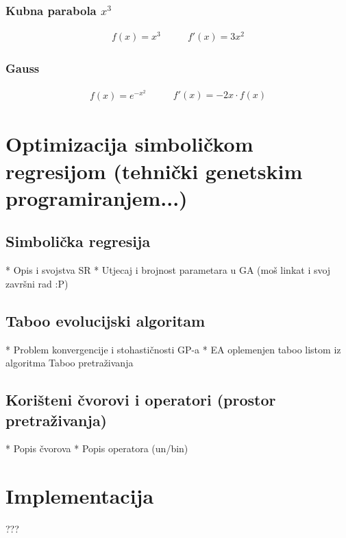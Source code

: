 \documentclass[times, utf8, diplomski]{fer}
\begin{document}
\subsection*{Kubna parabola $x^3$}
\begin{equation}
\begin{split}
f(x) = x^3
\end{split}
\qquad
\begin{split}
f'(x) = 3x^2
\end{split}
\end{equation}

\subsection*{Gauss}
\begin{equation}
\begin{split}
f(x) = e^{-x^2}
\end{split}
\qquad
\begin{split}
f'(x) = -2x \cdot f(x)
\end{split}
\end{equation}

\chapter{Optimizacija simboličkom regresijom (tehnički genetskim programiranjem...)}

\section{Simbolička regresija}
* Opis i svojstva SR
* Utjecaj i brojnost parametara u GA (moš linkat i svoj završni rad :P)

\section{Taboo evolucijski algoritam}
* Problem konvergencije i stohastičnosti GP-a
* EA oplemenjen taboo listom iz algoritma Taboo pretraživanja

\section{Korišteni čvorovi i operatori (prostor pretraživanja)}
* Popis čvorova
* Popis operatora (un/bin)

\chapter{Implementacija}
???
\end{document}
